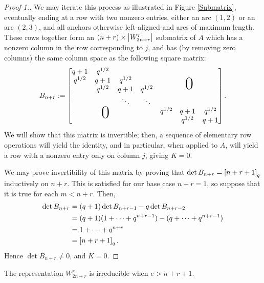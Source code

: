\documentclass{amsart}
\begin{document}
\begin{proof}[Proof 1.]
  We may iterate this process as illustrated in Figure \ref{Submatrix}, eventually ending at a row with two nonzero entries, either an arc $(1,2)$ or an arc $(2,3)$, and all anchors otherwise left-aligned and arcs of maximum length.
  These rows together form an $(n + r) \times \left| W_{2n + r}^r \right|$ submatrix of $A$ which has a nonzero column in the row corresponding to $j$, and has (by removing zero columns) the same column space as the following square matrix:
  \newcommand*\bigzero{\makebox(0,15){\text{\Huge0}}}
  \newcommand*\bigzerotwo{\makebox(-20,15){\text{\Huge0}}}
  \begin{equation}\label{Bnr}
    B_{n + r} := \begin{bmatrix}
      \begin{matrix}
      q + 1 & q^{1/2} & \\
      q^{1/2} & q + 1 & q^{1/2}\\
      & q^{1/2} & q + 1 & q^{1/2}\\
      &  & \ddots & \ddots
      \end{matrix}
      &   \bigzero\\
      \bigzerotwo & \begin{matrix}
        q^{1/2} & q+1 & q^{1/2}\\
        &  q^{1/2} & q + 1
       \end{matrix}
    \end{bmatrix}.
  \end{equation}
  We will show that this matrix is invertible;
  then, a sequence of elementary row operations will yield the identity, and in particular, when applied to $A$, will yield a row with a nonzero entry only on column $j$, giving $K = 0$.

  We may prove invertibility of this matrix by proving that $\det B_{n + r} = \left[ n + r + 1 \right]_q$ inductively on $n+r$.
  This is satisfied for our base case $n + r = 1$, so suppose that it is true for each $m < n + r$.
  Then,
  \begin{align*}
    \det B_{n+r} &= (q + 1) \det B_{n + r - 1} - q \det B_{n + r - 2}\\
    &= (q + 1)(1 + \dots + q^{n + r - 1}) - (q + \dots + q^{n + r - 1})\\
    &= 1 + \dots + q^{n + r}\\
    &= \left[ n + r + 1 \right]_q.
  \end{align*}
  Hence $\det B_{n + r} \neq 0$, and $K = 0$.
\end{proof}
\begin{proposition}
  The representation $W_{2n + r}^r$ is irreducible when $e > n + r + 1$. 
\end{proposition}
\end{document}

